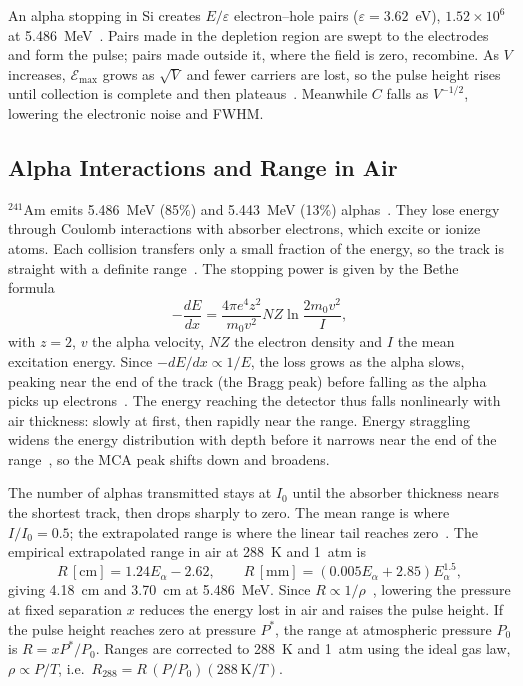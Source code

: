 An alpha stopping in Si creates $E/\varepsilon$ electron--hole pairs ($\varepsilon = 3.62$~eV), $1.52\times10^6$ at 5.486~MeV~\cite{knoll}. Pairs made in the depletion region are swept to the electrodes and form the pulse; pairs made outside it, where the field is zero, recombine. As $V$ increases, $\mathcal{E}_{\max}$ grows as $\sqrt{V}$ and fewer carriers are lost, so the pulse height rises until collection is complete and then plateaus~\cite{knoll}. Meanwhile $C$ falls as $V^{-1/2}$, lowering the electronic noise and FWHM.

\subsection{Alpha Interactions and Range in Air}
\label{subsec:range}

$^{241}$Am emits 5.486~MeV (85\%) and 5.443~MeV (13\%) alphas~\cite{knoll}. They lose energy through Coulomb interactions with absorber electrons, which excite or ionize atoms. Each collision transfers only a small fraction of the energy, so the track is straight with a definite range~\cite{knoll}. The stopping power is given by the Bethe formula~\cite{knoll}
\begin{equation}
    -\frac{dE}{dx} = \frac{4\pi e^4 z^2}{m_0 v^2} N Z \ln\frac{2m_0v^2}{I},
    \label{eq:bethe}
\end{equation}
with $z=2$, $v$ the alpha velocity, $NZ$ the electron density and $I$ the mean excitation energy. Since $-dE/dx \propto 1/E$, the loss grows as the alpha slows, peaking near the end of the track (the Bragg peak) before falling as the alpha picks up electrons~\cite{knoll}. The energy reaching the detector thus falls nonlinearly with air thickness: slowly at first, then rapidly near the range. Energy straggling widens the energy distribution with depth before it narrows near the end of the range~\cite{knoll}, so the MCA peak shifts down and broadens.

The number of alphas transmitted stays at $I_0$ until the absorber thickness nears the shortest track, then drops sharply to zero. The mean range is where $I/I_0 = 0.5$; the extrapolated range is where the linear tail reaches zero~\cite{knoll}. The empirical extrapolated range in air at 288~K and 1~atm is~\cite{labmanual}
\begin{equation}
    R\,[\text{cm}] = 1.24E_\alpha - 2.62, \qquad R\,[\text{mm}] = (0.005E_\alpha + 2.85)E_\alpha^{1.5},
    \label{eq:range}
\end{equation}
giving 4.18~cm and 3.70~cm at 5.486~MeV. Since $R \propto 1/\rho$~\cite{knoll}, lowering the pressure at fixed separation $x$ reduces the energy lost in air and raises the pulse height. If the pulse height reaches zero at pressure $P^*$, the range at atmospheric pressure $P_0$ is $R = xP^*/P_0$. Ranges are corrected to 288~K and 1~atm using the ideal gas law, $\rho \propto P/T$, i.e.\ $R_{288} = R\,(P/P_0)(288~\text{K}/T)$.

